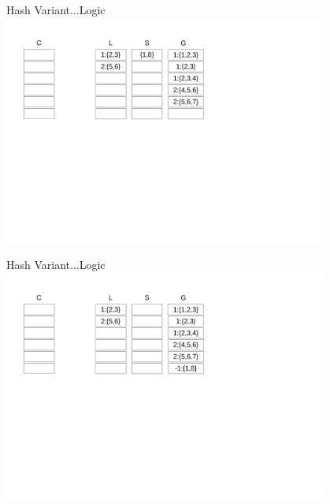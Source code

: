\documentclass{beamer}
\begin{document}
\begin{frame}{Hash Variant...}{Logic}
    \centering
    \includegraphics[trim={1cm 10cm 11cm 1cm}, clip,width=0.8\textwidth]{figures/L7} 
\end{frame}
\begin{frame}{Hash Variant...}{Logic}
    \centering
    \includegraphics[trim={1cm 10cm 11cm 1cm}, clip,width=0.8\textwidth]{figures/L8} 
\end{frame}
\end{document}
